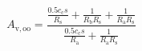 \begin{equation}
A_{\mathrm{v},\mathrm{oo}} = \frac{\frac{0.5 c_{\mathrm{c}} s}{R_{\mathrm{s}}} + \frac{1}{R_{\mathrm{b}} R_{\mathrm{s}}} + \frac{1}{R_{\mathrm{a}} R_{\mathrm{s}}}}{\frac{0.5 c_{\mathrm{c}} s}{R_{\mathrm{a}}} + \frac{1}{R_{\mathrm{a}} R_{\mathrm{s}}}}
\end{equation}

